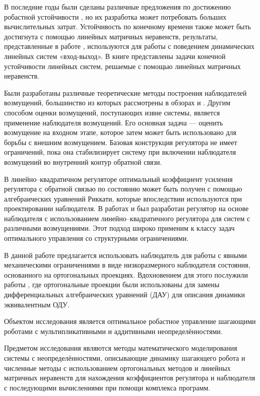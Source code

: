 В последние годы были сделаны различные предложения по достижению робастной устойчивости \cite{LMI7, LMI8}, но их разработка может потребовать больших вычислительных затрат.
Устойчивость по конечному времени также может быть достигнута с помощью линейных матричных неравенств, результаты, представленные в работе \cite{LMI6}, используются для работы с поведением динамических линейных систем «вход-выход». В книге \cite{Amato2011} представлены задачи конечной устойчивости линейных систем, решаемые с помощью линейных матричных неравенств.

Были разработаны различные теоретические методы построения наблюдателей возмущений, большинство из которых рассмотрены в обзорах \cite{ObserverITMO} и \cite{Disturb_obs}. Другим способом оценки возмущений, поступающих извне системы, является применение наблюдателя возмущений. Его основная задача --- оценить возмущение на входном этапе, которое затем может быть использовано для борьбы с внешним возмущением. Базовая конструкция регулятора не имеет ограничений, пока она стабилизирует систему при включении наблюдателя возмущений во внутренний контур обратной связи.

В линейно--квадратичном регуляторе оптимальный коэффициент усиления регулятора с обратной связью по состоянию может быть получен с помощью алгебраических уравнений Риккати, которые впоследствии используются при проектировании наблюдателя. В работах \cite{LQR1} и \cite{LQR2} был разработан регулятор на основе наблюдателя с использованием линейно--квадратичного регулятора для систем с различными возмущениями. Этот подход широко применим к классу задач оптимального управления со структурными ограничениями. 

В данной работе предлагается использовать наблюдатель для работы с явными механическими ограничениями в виде низкоразмерного наблюдателя состояния, основанного на ортогональных проекциях. Вдохновением для этого послужили работы \cite{SAVIN2021, Righetti2011}, где ортогональные проекции были использованы для замены дифференциальных алгебраических уравнений (ДАУ) для описания динамики эквивалентным ОДУ. 

{\objectsubject} 

Объектом исследования является оптимальное робастное управление шагающими роботами с мультипликативными и аддитивными неопределённостями.

Предметом исследования являются методы математического моделирования системы с неопределённостями, описывающие динамику шагающего робота и численные методы с использованием ортогональных методов и линейных матричных неравенств для нахождения коэффициентов регулятора и наблюдателя с последующими вычислениями при помощи комплекса программ.

